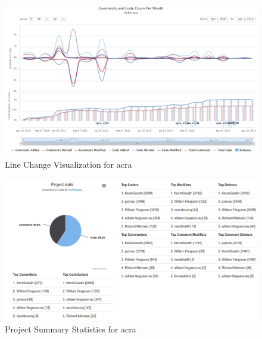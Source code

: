 

\begin{landscape}
 \thispagestyle{empty}
 \begin{figure}
  \centering
        \includegraphics[width=1.5\textwidth]{images/lines_visual_acra}
    \caption{Line Change Visualization for acra}
    \label{fig:line_visual_acra}
 \end{figure}
\end{landscape}
\pagestyle{plain}

\begin{landscape}
\thispagestyle{empty}
 \begin{figure}
  \centering
        \includegraphics[width=1.5\textwidth]{images/table_visual}
    \caption{Project Summary Statistics for acra}
    \label{fig:project_summary_stats}
 \end{figure}
\end{landscape}
\pagestyle{plain}

